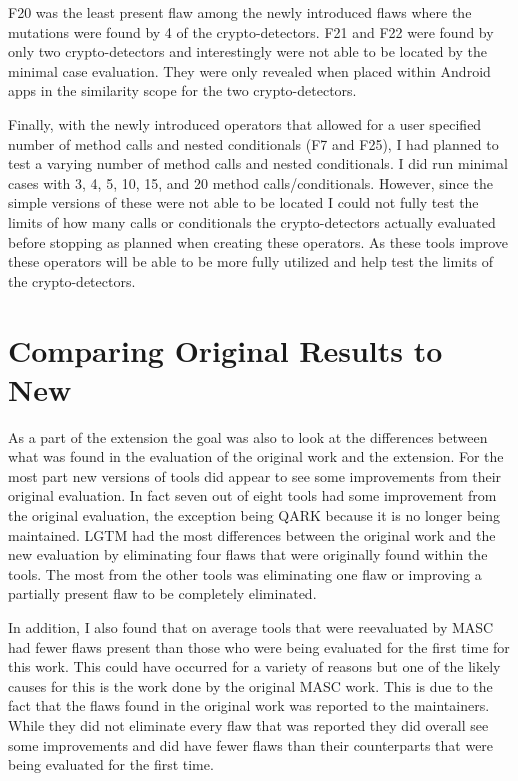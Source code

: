 F20 was the least present flaw among the newly introduced flaws where the mutations were found by 4 of the crypto-detectors. F21 and F22 were found by only two crypto-detectors and interestingly were not able to be located by the minimal case evaluation. They were only revealed when placed within Android apps in the similarity scope for the two crypto-detectors.

Finally, with the newly introduced operators that allowed for a user specified number of method calls and nested conditionals (F7 and F25), I had planned to test a varying number of method calls and nested conditionals. I did run minimal cases with 3, 4, 5, 10, 15, and 20 method calls/conditionals. However, since the simple versions of these were not able to be located I could not fully test the limits of how many calls or conditionals the crypto-detectors actually evaluated before stopping as planned when creating these operators. As these tools improve these operators will be able to be more fully utilized and help test the limits of the crypto-detectors.






\section{Comparing Original Results to New}
\label{ch5:sec:comparison}

As a part of the extension the goal was also to look at the differences between what was found in the evaluation of the original work and the extension. For the most part new versions of tools did appear to see some improvements from their original evaluation. In fact seven out of eight tools had some improvement from the original evaluation, the exception being QARK because it is no longer being maintained. LGTM had the most differences between the original work and the new evaluation by eliminating four flaws that were originally found within the tools. The most from the other tools was eliminating one flaw or improving a partially present flaw to be completely eliminated. 

In addition, I also found that on average tools that were reevaluated by MASC had fewer flaws present than those who were being evaluated for the first time for this work. This could have occurred for a variety of reasons but one of the likely causes for this is the work done by the original MASC work. This is due to the fact that the flaws found in the original work was reported to the maintainers. While they did not eliminate every flaw that was reported they did overall see some improvements and did have fewer flaws than their counterparts that were being evaluated for the first time.

